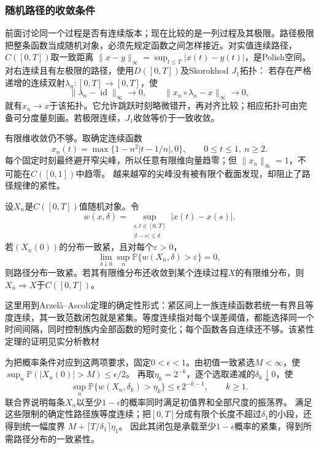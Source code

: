 \subsubsection{随机路径的收敛条件}
\label{sec:rv-path-convergence}
前面讨论同一个过程是否有连续版本；现在比较的是一列过程及其极限。路径极限
把整条函数当成随机对象，必须先规定函数之间怎样接近。对实值连续路径，
\(C([0,T])\)取一致距离
\(\|x-y\|_\infty=\sup_{t\leq T}|x(t)-y(t)|\)，是Polish空间。
对右连续且有左极限的路径，使用\(D([0,T])\)及Skorokhod \(J_1\)拓扑：
若存在严格递增的连续双射\(\lambda_n:[0,T]\to[0,T]\)，使
\[
\|\lambda_n-\operatorname{id}\|_\infty\to0,\qquad
\|x_n\circ\lambda_n-x\|_\infty\to0,
\]
就有\(x_n\to x\)于该拓扑。它允许跳跃时刻略微错开，再对齐比较；相应拓扑可由完备可分度量刻画。若极限连续，\(J_1\)收敛等价于一致收敛。

有限维收敛仍不够。取确定连续函数
\[
x_n(t)=\max\{1-n^2|t-1/n|,0\},\qquad 0\leq t\leq1,\ n\geq2.
\]
每个固定时刻最终避开窄尖峰，所以任意有限维向量趋零；但
\(\|x_n\|_\infty=1\)，不可能在\(C([0,1])\)中趋零。
越来越窄的尖峰没有被有限个截面发现，却阻止了路径规律的紧性。

\begin{theorem}[连续路径的紧性与极限识别]
\label{thm:rv-continuous-path-tightness}
设\(X_n\)是\(C([0,T])\)值随机对象。令
\[
w(x,\delta)=\sup_{\substack{s,t\in[0,T]\\|t-s|\leq\delta}}|x(t)-x(s)|.
\]
若\((X_n(0))\)的分布一致紧，且对每个\(\varepsilon>0\)，
\[
\lim_{\delta\downarrow0}\sup_n
\mathbb P\{w(X_n,\delta)>\varepsilon\}=0,
\]
则路径分布一致紧。若其有限维分布还收敛到某个连续过程\(X\)的有限维分布，则
\(X_n\Rightarrow X\)于\(C([0,T])\)。
\end{theorem}
这里用到Arzelà--Ascoli定理的确定性形式：紧区间上一族连续函数若统一有界且等度连续，其一致范数闭包就是紧集。等度连续指对每个误差阈值，都能选择同一个时间间隔，同时控制族内全部函数的短时变化；每个函数各自连续还不够。该紧性定理的证明见实分析教材

为把概率条件对应到这两项要求，固定\(0<\epsilon<1\)。由初值一致紧选\(M<\infty\)，使
\(\sup_n\mathbb P(|X_n(0)|>M)\leq\epsilon/2\)。
再取\(\eta_k=2^{-k}\)，逐个选取递减的\(\delta_k\downarrow0\)，使
\[
 \sup_n\mathbb P\{w(X_n,\delta_k)>\eta_k\}
 \leq\epsilon\,2^{-k-1},\qquad k\geq1.
\]
联合界说明每条\(X_n\)以至少\(1-\epsilon\)的概率同时满足初值界和全部尺度的振荡界。
满足这些限制的确定性路径族等度连续；把\([0,T]\)分成有限个长度不超过\(\delta_1\)的小段，还得到统一幅度界
\(M+\lceil T/\delta_1\rceil\eta_1\)。
因此其闭包是承载至少\(1-\epsilon\)概率的紧集，得到所需路径分布的一致紧性。


